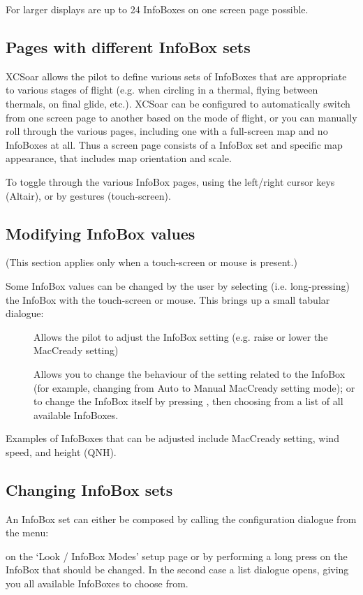 For larger displays are up to 24 InfoBoxes on one screen page possible.

\subsection*{Pages with different InfoBox sets}

XCSoar allows the pilot to define various sets of InfoBoxes that are 
appropriate to various stages of flight (e.g. when circling in a thermal, 
flying between thermals, on final glide, etc.). XCSoar can be configured 
to automatically switch from one screen page to another based on the mode 
of flight, or you can manually roll through the various pages, including 
one with a full-screen map and no InfoBoxes at all. Thus a screen page 
consists of a InfoBox set and specific map appearance, that includes 
map orientation and scale.

To toggle through the various InfoBox pages, using the left/right cursor 
keys (Altair), or by gestures (touch-screen).


\subsection*{Modifying InfoBox values}
(This section applies only when a touch-screen or mouse is present.)

Some InfoBox values can be changed by the user by selecting (i.e. long-pressing) the
InfoBox with the touch-screen or mouse.  This brings up a small tabular dialogue:

\begin{description}
\item[]  
  Allows the pilot to adjust the InfoBox setting (e.g. raise or lower the 
  MacCready setting)

\item[]
  Allows you to change the behaviour of the setting related to the InfoBox 
  (for example, changing from Auto to Manual MacCready setting mode); or 
  to change the InfoBox itself by pressing , then 
  choosing from a list of all available InfoBoxes.

\end{description}


Examples of InfoBoxes that can
be adjusted include MacCready setting, wind speed, and height (QNH).

\subsection*{Changing InfoBox sets}
An InfoBox set can either be composed by calling the configuration dialogue 
from the menu: \begin{center}
\blink{}
\end{center}
on the `Look / InfoBox Modes' setup page or by
performing a long press on the InfoBox that should be changed. In the second 
case a list dialogue opens, giving you all available InfoBoxes to choose from.

